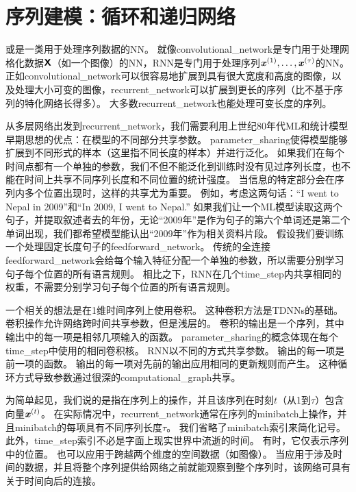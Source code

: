 \chapter{序列建模：循环和递归网络}
\label{chap:sequence_modeling_recurrent_and_recursive_nets}
或\citep{RHW}是一类用于处理序列数据的\gls{NN}。
就像\gls{convolutional_network}是专门用于处理网格化数据$\textsf{\textbf{X}}$（如一个图像）的\gls{NN}，\gls{RNN}是专门用于处理序列$\boldsymbol{\mathit{x}}^{(1)}, \dots, \boldsymbol{\mathit{x}}^{(\tau)}$的\gls{NN}。
正如\gls{convolutional_network}可以很容易地扩展到具有很大宽度和高度的图像，以及处理大小可变的图像，\gls{recurrent_network}可以扩展到更长的序列（比不基于序列的特化网络长得多）。
大多数\gls{recurrent_network}也能处理可变长度的序列。 

从多层网络出发到\gls{recurrent_network}，我们需要利用上世纪80年代\gls{ML}和统计模型早期思想的优点：在模型的不同部分共享参数。
\gls{parameter_sharing}使得模型能够扩展到不同形式的样本（这里指不同长度的样本）并进行泛化。
如果我们在每个时间点都有一个单独的参数，我们不但不能泛化到训练时没有见过序列长度，也不能在时间上共享不同序列长度和不同位置的统计强度。
当信息的特定部分会在序列内多个位置出现时，这样的共享尤为重要。
例如，考虑这两句话：``I went to Nepal in 2009''和``In 2009, I went to Nepal.'' 
如果我们让一个\gls{ML}模型读取这两个句子，并提取叙述者去的年份，无论``2009年''是作为句子的第六个单词还是第二个单词出现，我们都希望模型能认出``2009年''作为相关资料片段。
假设我们要训练一个处理固定长度句子的\gls{feedforward_network}。
传统的全连接\gls{feedforward_network}会给每个输入特征分配一个单独的参数，所以需要分别学习句子每个位置的所有语言规则。
相比之下，\gls{RNN}在几个\gls{time_step}内共享相同的权重，不需要分别学习句子每个位置的所有语言规则。


一个相关的想法是在1维时间序列上使用卷积。
这种卷积方法是\gls{TDNNs}的基础\citep{Lang+Hinton88,Waibel89b,lang1990time}。
卷积操作允许网络跨时间共享参数，但是浅层的。
卷积的输出是一个序列，其中输出中的每一项是相邻几项输入的函数。
\gls{parameter_sharing}的概念体现在每个\gls{time_step}中使用的相同卷积核。
\gls{RNN}以不同的方式共享参数。
输出的每一项是前一项的函数。
输出的每一项对先前的输出应用相同的更新规则而产生。
这种循环方式导致参数通过很深的\gls{computational_graph}共享。

为简单起见，我们说的是指在序列上的操作，并且该序列在时刻$t$（从1到$\tau$）包含向量$\boldsymbol{\mathit{x}}^{(t)}$。
在实际情况中，\gls{recurrent_network}通常在序列的\gls{minibatch}上操作，并且\gls{minibatch}的每项具有不同序列长度$\tau$。
我们省略了\gls{minibatch}索引来简化记号。
此外，\gls{time_step}索引不必是字面上现实世界中流逝的时间。
有时，它仅表示序列中的位置。
也可以应用于跨越两个维度的空间数据（如图像）。
当应用于涉及时间的数据，并且将整个序列提供给网络之前就能观察到整个序列时，该网络可具有关于时间向后的连接。


